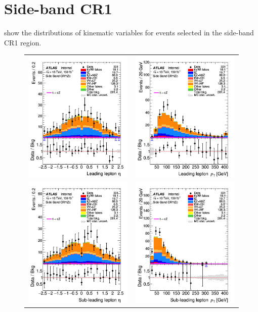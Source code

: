 \clearpage
\FloatBarrier
\section{Side-band CR1}
\label{app:CRs:SB1}
 show the distributions 
of kinematic variables for events selected in the side-band CR1 region. 

\begin{figure}[!htbp]
	\centering
	\begin{tabular}{cc}
		\includegraphics[width=.32\textwidth]{Appendices/AP6/figures/SBCR1/lep1_eta} &
		\includegraphics[width=.32\textwidth]{Appendices/AP6/figures/SBCR1/lep1_pt} \\
		\includegraphics[width=.32\textwidth]{Appendices/AP6/figures/SBCR1/lep2_eta} &
		\includegraphics[width=.32\textwidth]{Appendices/AP6/figures/SBCR1/lep2_pt} \\

\end{tabular}
\end{figure}
